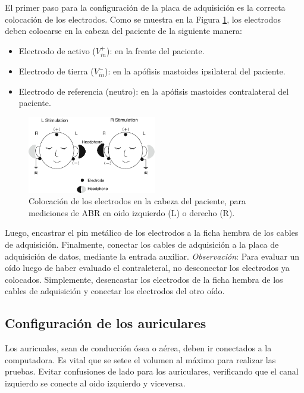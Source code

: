 El primer paso para la configuración de la placa de adquisición es la correcta colocación de los electrodos.
Como se muestra en la Figura \ref{fig:electrodos}, los electrodos deben colocarse en la cabeza del paciente de la siguiente manera:
\begin{itemize}
    \item Electrodo de activo ($V_{in}^{+}$): en la frente del paciente.
    \item Electrodo de tierra ($V_{in}^{-}$): en la apófisis mastoides ipsilateral del paciente.
    \item Electrodo de referencia (neutro): en la apófisis mastoides contralateral del paciente.
\end{itemize}

\begin{figure}[H]
    \centering
    \includegraphics[width=0.5\textwidth]{figuras/electrodos.png}
    \caption{Colocación de los electrodos en la cabeza del paciente, para mediciones de ABR en oido izquierdo (L) o derecho (R).}
    \label{fig:electrodos}
\end{figure}

Luego, encastrar el pin metálico de los electrodos a la ficha hembra de los cables de adquisición.
Finalmente, conectar los cables de adquisición a la placa de adquisición de datos, mediante la entrada auxiliar.
\textit{Observación}: Para evaluar un oído luego de haber evaluado el contraleteral, no desconectar los electrodos
ya colocados.
Simplemente, desencastar los electrodos de la ficha hembra de los cables de adquisición y conectar los electrodos del otro oído.

\subsection{Configuración de los auriculares} \label{configuracion_auriculares}

Los auricuales, sean de conducción ósea o aérea, deben ir conectados a la computadora.
Es vital que se setee el volumen al máximo para realizar las pruebas.
Evitar confusiones de lado para los auriculares, verificando que el canal izquierdo se conecte al oido izquierdo y
viceversa.